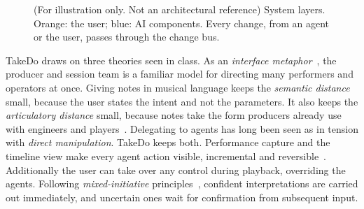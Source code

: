 \documentclass[sigconf,nonacm]{acmart}
\newcommand{\projectname}{TakeDo}
\begin{document}
\begin{figure}[t]
  \centering
  
  \caption{(For illustration only. Not an architectural reference) System layers. Orange: the user; blue: AI components. Every change, from an agent or the user, passes through the change bus.}
  \label{fig:layers}
\end{figure}

\projectname{} draws on three theories seen in class. As an \emph{interface metaphor}~\cite{neale1997metaphors}, the producer and session team is a familiar model for directing many performers and operators at once. Giving notes in musical language keeps the \emph{semantic distance} small, because the user states the intent and not the parameters. It also keeps the \emph{articulatory distance} small, because notes take the form producers already use with engineers and players~\cite{hutchins1985direct}. Delegating to agents has long been seen as in tension with \emph{direct manipulation}. \projectname{} keeps both. Performance capture and the timeline view make every agent action visible, incremental and reversible~\cite{shneiderman1983direct}. Additionally the user can take over any control during playback, overriding the agents. Following \emph{mixed-initiative} principles~\cite{horvitz1999principles}, confident interpretations are carried out immediately, and uncertain ones wait for confirmation from subsequent input.
\end{document}
